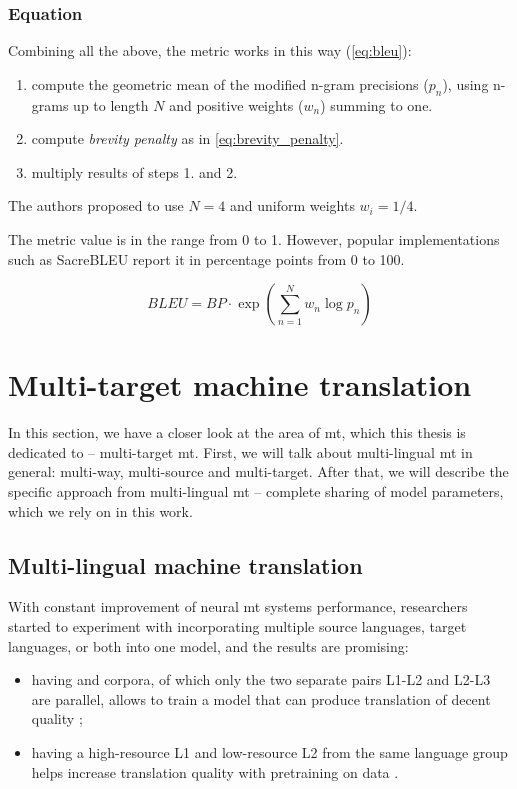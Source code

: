 \subsubsection*{Equation}

Combining all the above, the metric works in this way (\cref{eq:bleu}):
\begin{enumerate}
	\item compute the geometric mean of the modified
		n-gram precisions ($p_n$), using n-grams up to length $N$
		and positive weights ($w_n$) summing to one.
	\item compute \textit{brevity penalty} as in \cref{eq:brevity_penalty}.
	\item multiply results of steps 1. and 2.
\end{enumerate}
The authors proposed to use $N=4$ and uniform weights $w_i = 1/4$.

The metric value is in the range from 0 to 1.
However, popular implementations such as SacreBLEU \citep{Post2018-sacrebleu}
report it in percentage points from 0 to 100.


\begin{equation}
\label{eq:bleu}
	BLEU=BP \cdot \exp \left(\sum_{n=1}^{N} w_n \log p_n \right)
\end{equation}


\section{Multi-target machine translation}
\label{section:multitarget_mt}

In this section, we have a closer look at the area of \acrshort{mt},
which this thesis is dedicated to -- multi-target \acrshort{mt}.
First, we will talk about multi-lingual \acrshort{mt} in general: multi-way,
multi-source and multi-target.
After that, we will describe the specific approach from multi-lingual \acrshort{mt}
-- complete sharing of model parameters, which we rely on in this work.


\subsection{Multi-lingual machine translation}

With constant improvement of neural \acrshort{mt} systems performance,
researchers started to experiment with incorporating multiple source
languages, target languages, or both into one model,
and the results are promising:
\begin{itemize}
	\item having  and  corpora, of which only
	the two separate pairs L1-L2 and L2-L3 are parallel,
	allows to train a model that can produce  translation
	of decent quality \citep{johnson-etal-2017-googles};
	\item having a high-resource L1 and low-resource L2
	from the same language group helps increase  translation
	quality with pretraining on  data 
	\citep{Dabre2017}.
\end{itemize}

